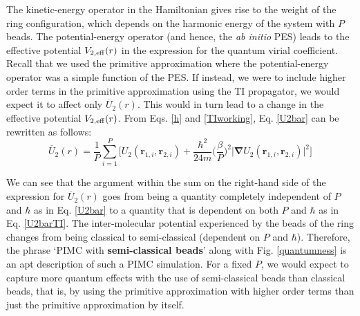             The kinetic-energy operator in the Hamiltonian gives rise to the weight of the ring configuration, which depends on the harmonic energy of the system with $P$ beads. The potential-energy operator (and hence, the \emph{ab initio} PES) leads to the effective potential $V_{2,\rm{eff}} (r)$ in the expression for the quantum virial coefficient. Recall that we used the primitive approximation where the potential-energy operator was a simple function of the PES. If instead, we were to include higher order terms in the primitive approximation using the TI propagator, we would expect it to affect only $\overline{U}_2 (r)$. This would in turn lead to a change in the effective potential $V_{2,\rm{eff}} (r)$. From Eqs. \eqref{h} and \eqref{TIworking}, Eq. \eqref{U2bar} can be rewritten as follows:
            \begin{equation} \label{U2barTI}
                \overline{U}_2 (r) = \displaystyle\frac{1}{P} \sum\limits_{i=1}^P \Bigg[ U_2 (\bm{r}_{1,i}, \bm{r}_{2,i}) + \frac{\hbar^2}{24m} \bigg(\displaystyle\frac{\beta}{P} \bigg)^2 \big| \pmb{\nabla} U_2 (\bm{r}_{1,i}, \bm{r}_{2,i}) \big|^2 \Bigg]
            \end{equation}

            We can see that the argument within the sum on the right-hand side of the expression for $\overline{U}_2 (r)$ goes from being a quantity completely independent of $P$ and $\hbar$ as in Eq. \eqref{U2bar} to a quantity that is dependent on both $P$ and $\hbar$ as in Eq. \eqref{U2barTI}. The inter-molecular potential experienced by the beads of the ring changes from being classical to semi-classical (dependent on $P$ and $\hbar$). Therefore, the phrase `PIMC with \textbf{semi-classical beads}' along with Fig. \ref{quantumness} is an apt description of such a PIMC simulation. For a fixed $P$, we would expect to capture more quantum effects with the use of semi-classical beads than classical beads, that is, by using the primitive approximation with higher order terms than just the primitive approximation by itself.

